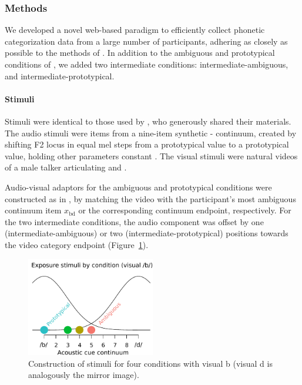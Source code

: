 \subsubsection{Methods}
\label{sec:methods-4}

We developed a novel web-based paradigm to efficiently collect phonetic categorization data from a large number of participants, adhering as closely as possible to the methods of \textcite{Vroomen2007}.  In addition to the ambiguous and prototypical conditions of \textcite{Vroomen2007}, we added two intermediate conditions: intermediate-ambiguous, and intermediate-prototypical.

\paragraph{Stimuli}
\label{sec:stimuli}

Stimuli were identical to those used by \textcite{Vroomen2007}, who generously shared their materials.  The audio stimuli were items from a nine-item synthetic - continuum, created by shifting F2 locus in equal mel steps from a prototypical  value to a prototypical  value, holding other parameters constant \autocite{Vroomen2004}.  The visual stimuli were natural videos of a male talker articulating  and .

Audio-visual adaptors for the ambiguous and prototypical conditions were constructed as in \textcite{Vroomen2007}, by matching the video with the participant's most ambiguous continuum item $x_\mathrm{bd}$ or the corresponding continuum endpoint, respectively.  For the two intermediate conditions, the audio component was offset by one (intermediate-ambiguous) or two (intermediate-prototypical) positions towards the video category endpoint (Figure~\ref{fig:conditions-schematic}).

\begin{figure}[htb]
  \centering
  \includegraphics[width=0.5\textwidth]{figs/schematic-conditions-modified.pdf}
  \caption{Construction of stimuli for four conditions with visual \ph b (visual \ph d is analogously the mirror image).}
  \label{fig:conditions-schematic}
\end{figure}

